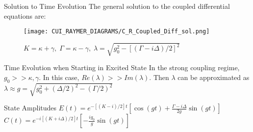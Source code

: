 \begin{frame}{Solution to Time Evolution}
    The general solution to the coupled differential equations are:
    \begin{figure}
        \centering
        \texttt{[image: CUI\_RAYMER\_DIAGRAMS/C\_R\_Coupled\_Diff\_sol.png]}
        \caption{$K = \kappa + \gamma,\; \Gamma = \kappa - \gamma, \; \lambda = \sqrt{g_0^2 - \left[(\Gamma - i \Delta)/2\right]^2}$ }
        \label{fig:coupled_diff_sol}
    \end{figure}
\end{frame}

\begin{frame}{Time Evolution when Starting in Excited State}
    In the strong coupling regime, $g_0 >> \kappa, \gamma$. In this case, $Re(\lambda) >> Im(\lambda)$. Then $\lambda$ can be approximated as $ \lambda \approx g = \sqrt{g_0^2 + (\Delta / 2)^2 - (\Gamma /2 )^2 }$ \newline 
   
    
    \begin{block}{State Amplitudes}
        $E(t) = e^{- \left[ (K - i)/2\right] t}\left[ \cos (g t) + \frac{\Gamma - i \Delta}{2 g} \sin (g t) \right ]$\newline
        $C(t) = e^{-i \left [ (K + i \Delta )/2\right] t} \left [ - \frac{i g_0 }{g} \sin (g t) \right ] $
    \end{block}
\end{frame}


